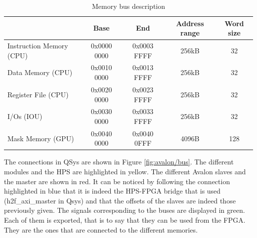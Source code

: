 \begin{table}[ht!]
    \centering
    \begin{tabular}{|l|c|c|c|c|}
    \hline
    \rowcolor[HTML]{DAE8FC} 
    \multicolumn{1}{|c|}{\cellcolor[HTML]{DAE8FC}\textbf{Access}} & \textbf{Base} & \textbf{End} & \textbf{Address range} & \textbf{Word size} \\ \hline
    Instruction Memory (CPU)                                      & 0x0000 0000   & 0x0003 FFFF  & 256kB             & 32                 \\ \hline
    Data Memory (CPU)                                             & 0x0010 0000   & 0x0013 FFFF  & 256kB             & 32                 \\ \hline
    Register File (CPU)                                           & 0x0020 0000   & 0x0023 FFFF  & 256kB             & 32                 \\ \hline
    I/Os (IOU)                                                    & 0x0030 0000   & 0x0033 FFFF  & 256kB             & 32                 \\ \hline
    Mask Memory (GPU)                                             & 0x0040 0000   & 0x0040 0FFF  & 4096B             & 128                \\ \hline
    \end{tabular}
    \caption{Memory bus description}
    \label{mau/bus}
\end{table}

The connections in QSys are shown in Figure \ref{fig:avalon/bus}. 
The different modules and the HPS are highlighted in 
yellow. The different Avalon slaves and the master are shown in red. It can be noticed by following 
the connection highlighted in blue that it is indeed the HPS-FPGA bridge that is used 
(h2f\_axi\_master in Qsys) and that the offsets of the slaves are indeed those previously given. The 
signals corresponding to the buses are displayed in green. Each of them is exported, that is to say 
that they can be used from the FPGA. They are the ones that are connected to the different memories.

